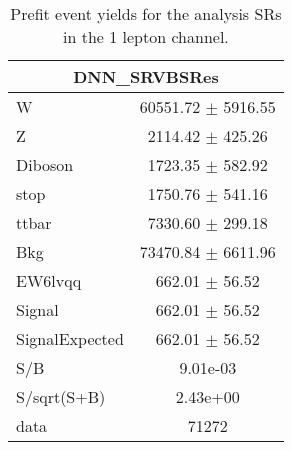 \begin{table}[ht]
\begin{tabular}{|l|c|}
\hline
 \multicolumn{2}{|c|}{DNN\_SRVBSRes}\\ \hline
W & 60551.72 $\pm$ 5916.55\\
Z & 2114.42 $\pm$ 425.26\\
Diboson & 1723.35 $\pm$ 582.92\\
stop & 1750.76 $\pm$ 541.16\\
ttbar & 7330.60 $\pm$ 299.18\\
\hline
Bkg & 73470.84 $\pm$ 6611.96\\
\hline
EW6lvqq & 662.01 $\pm$ 56.52\\
\hline
Signal & 662.01 $\pm$ 56.52\\
SignalExpected & 662.01 $\pm$ 56.52\\
\hline
S/B & 9.01e-03\\
S/sqrt(S+B) & 2.43e+00\\
\hline
data & 71272\\ \hline
\end{tabular}
\caption{Prefit event yields for the analysis SRs in the 1 lepton channel.}
\label{tab:1lepPrefitYield_SR}
\end{table}


